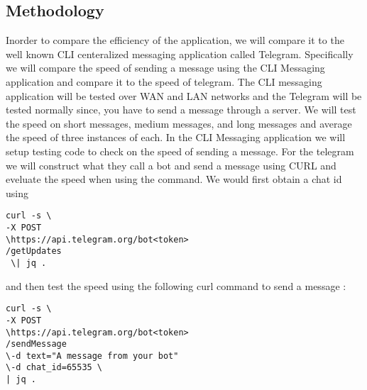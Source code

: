 \documentclass[twoside]{article}
\begin{document}
\begin{multicols}{2}
\subsection{Methodology}
Inorder to compare the efficiency of the application, we will compare it to the well known CLI centeralized messaging application called Telegram. Specifically we will compare the speed of sending a message using the CLI Messaging application and compare it to the speed of telegram. The CLI messaging application will be tested over WAN and LAN networks and the Telegram will be tested normally since, you have to send a message through a server. We will test the speed on short messages, medium messages, and long messages and average the speed of three instances of each. In the CLI Messaging application we will setup testing code to check on the speed of sending a message. For the telegram we will construct what they call a bot and send a message using CURL and eveluate the speed when using the command. We would first obtain a chat id using 
\begin{lstlisting}
curl -s \ 
-X POST 
\https://api.telegram.org/bot<token>
/getUpdates
 \| jq .
\end{lstlisting} 
and then test the speed using the following curl command to send a message \cite{malizia}: 
\begin{lstlisting}
curl -s \
-X POST 
\https://api.telegram.org/bot<token>
/sendMessage 
\-d text="A message from your bot" 
\-d chat_id=65535 \ 
| jq .
\end{lstlisting} 


\end{multicols}
\end{document}
